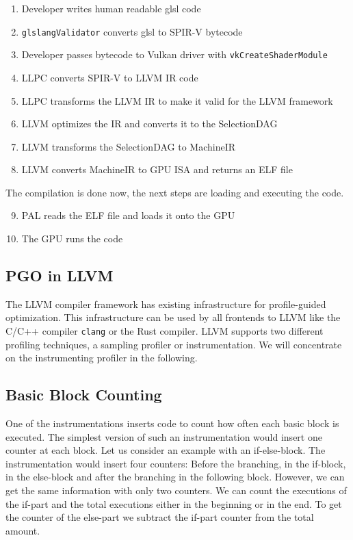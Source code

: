 \begin{enumerate}
	\item Developer writes human readable \gls{glsl} code
	\item \texttt{glslangValidator} converts \gls{glsl} to SPIR-V bytecode
	\item Developer passes bytecode to Vulkan driver with \texttt{vkCreateShaderModule}
	\item LLPC converts SPIR-V to LLVM IR code
	\item LLPC transforms the LLVM IR to make it valid for the LLVM framework
	\item LLVM optimizes the IR and converts it to the SelectionDAG
	\item LLVM transforms the SelectionDAG to MachineIR
	\item LLVM converts MachineIR to GPU ISA and returns an ELF file
\end{enumerate}
The compilation is done now, the next steps are loading and executing the code.
\begin{enumerate}
	\setcounter{enumi}{8}
	\item PAL reads the ELF file and loads it onto the GPU
	\item The GPU runs the code
\end{enumerate}

\subsection{PGO in LLVM}
\label{sub:pgo-background}
The LLVM compiler framework has existing infrastructure for profile-guided optimization. This infrastructure can be used by all frontends to LLVM like the C/C++ compiler \texttt{clang} or the Rust compiler. LLVM supports two different profiling techniques, a sampling profiler or instrumentation. We will concentrate on the instrumenting profiler in the following.

\subsection{Basic Block Counting}
\label{sub:counter-instrumentation}
One of the instrumentations inserts code to count how often each basic block is executed. The simplest version of such an instrumentation would insert one counter at each block. Let us consider an example with an if-else-block. The instrumentation would insert four counters: Before the branching, in the if-block, in the else-block and after the branching in the following block. However, we can get the same information with only two counters. We can count the executions of the if-part and the total executions either in the beginning or in the end. To get the counter of the else-part we subtract the if-part counter from the total amount.

